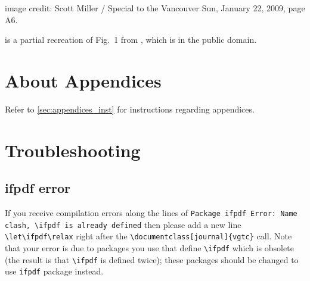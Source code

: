 \documentclass[journal]{vgtc}                     %
\begin{document}
 image credit: Scott Miller / Special to the Vancouver Sun, January 22, 2009, page A6.

 is a partial recreation of Fig.\ 1 from \cite{Isenberg:2017:VMC}, which is in the public domain.





%
%
%





\appendix %

\section{About Appendices}
Refer to \cref{sec:appendices_inst} for instructions regarding appendices.

\section{Troubleshooting}
\label{appendix:troubleshooting}

\subsection{ifpdf error}

If you receive compilation errors along the lines of \texttt{Package ifpdf Error: Name clash, \textbackslash ifpdf is already defined} then please add a new line \verb|\let\ifpdf\relax| right after the \verb|\documentclass[journal]{vgtc}| call.
Note that your error is due to packages you use that define \verb|\ifpdf| which is obsolete (the result is that \verb|\ifpdf| is defined twice); these packages should be changed to use \verb|ifpdf| package instead.
\end{document}

